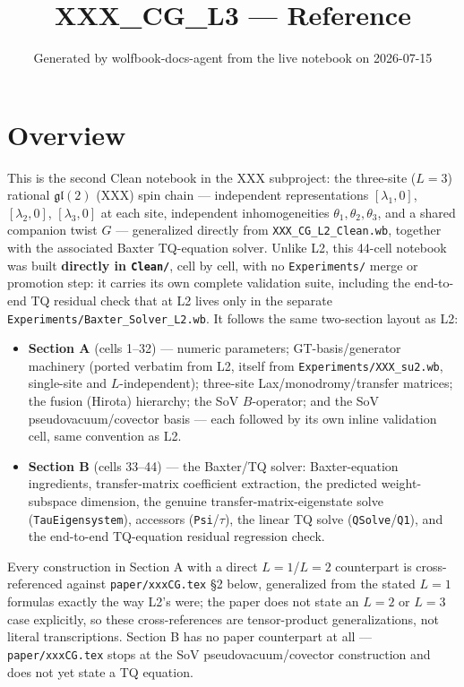 \documentclass[11pt]{article}
\title{XXX\_CG\_L3 --- Reference}
\author{}
\date{Generated by wolfbook-docs-agent from the live notebook on 2026-07-15}
\begin{document}
\maketitle

\section*{Overview}

This is the second Clean notebook in the XXX subproject: the three-site ($L=3$) rational
$\mathfrak{gl}(2)$ (XXX) spin chain --- independent representations $[\lambda_1,0]$, $[\lambda_2,0]$,
$[\lambda_3,0]$ at each site, independent inhomogeneities $\theta_1,\theta_2,\theta_3$, and a shared
companion twist $G$ --- generalized directly from \texttt{XXX\_CG\_L2\_Clean.wb}, together with the
associated Baxter TQ-equation solver. Unlike L2, this 44-cell notebook was built \textbf{directly in
\texttt{Clean/}}, cell by cell, with no \texttt{Experiments/} merge or promotion step: it carries its
own complete validation suite, including the end-to-end TQ residual check that at L2 lives only in
the separate \texttt{Experiments/Baxter\_Solver\_L2.wb}. It follows the same two-section layout as
L2:

\begin{itemize}
\item \textbf{Section A} (cells 1--32) --- numeric parameters; GT-basis/generator machinery (ported
  verbatim from L2, itself from \texttt{Experiments/XXX\_su2.wb}, single-site and $L$-independent);
  three-site Lax/monodromy/transfer matrices; the fusion (Hirota) hierarchy; the SoV $B$-operator;
  and the SoV pseudovacuum/covector basis --- each followed by its own inline validation cell, same
  convention as L2.
\item \textbf{Section B} (cells 33--44) --- the Baxter/TQ solver: Baxter-equation ingredients,
  transfer-matrix coefficient extraction, the predicted weight-subspace dimension, the genuine
  transfer-matrix-eigenstate solve (\texttt{TauEigensystem}), accessors (\texttt{Psi}/$\tau$), the
  linear TQ solve (\texttt{QSolve}/\texttt{Q1}), and the end-to-end TQ-equation residual regression
  check.
\end{itemize}

Every construction in Section A with a direct $L=1$/$L=2$ counterpart is cross-referenced against
\texttt{paper/xxxCG.tex} \S2 below, generalized from the stated $L=1$ formulas exactly the way L2's
were; the paper does not state an $L=2$ or $L=3$ case explicitly, so these cross-references are
tensor-product generalizations, not literal transcriptions. Section B has no paper counterpart at
all --- \texttt{paper/xxxCG.tex} stops at the SoV pseudovacuum/covector construction and does not yet
state a TQ equation.
\end{document}
